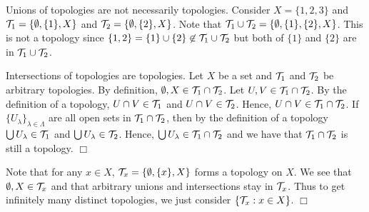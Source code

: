 \documentclass{article}
\begin{document}
 {
    Unions of topologies are not necessarily topologies. Consider $X = \{1, 2, 3\}$ and $\mathcal{T}_{1} = \{\emptyset, \{1\}, X\}$ and $\mathcal{T}_{2} = \{\emptyset, \{2\}, X\}$. Note that $\mathcal{T}_{1} \cup \mathcal{T}_{2} = \{\emptyset, \{1\}, \{2\}, X\}$. This is not a topology since $\{1,2\} = \{1\}\cup \{2\} \not\in\mathcal{T}_{1} \cup \mathcal{T}_{2}  $ but both of $\{1\}$ and $\{2\}$ are in $\mathcal{T}_{1} \cup \mathcal{T}_{2}$. 

    Intersections of topologies are topologies. Let $X$ be a set and $\mathcal{T}_{1}$ and $\mathcal{T}_{2}$ be arbitrary topologies. By definition, $\emptyset, X\in \mathcal{T}_{1}\cap \mathcal{T}_{2}$. Let $U,V\in \mathcal{T}_{1}\cap \mathcal{T}_{2}$. By the definition of a topology, $U\cap V \in \mathcal{T}_{1}$ and $U\cap V \in \mathcal{T}_{2}$. Hence, $U\cap V\in \mathcal{T}_{1}\cap \mathcal{T}_{2}$. If $\{U_{\lambda}\}_{\lambda\in \Lambda}$ are all open sets in $\mathcal{T}_{1}\cap\mathcal{T}_{2}$, then by the definition of a topology $\bigcup U_{\lambda}\in \mathcal{T}_{1}$ and $\bigcup U_{\lambda}\in \mathcal{T}_{2}$. Hence, $\bigcup U_{\lambda}\in \mathcal{T}_{1}\cap\mathcal{T}_{2}$ and we have that $\mathcal{T}_{1}\cap \mathcal{T}_{2}$ is still a topology. $\Box$
}

 {
    Note that for any $x\in X$, $\mathcal{T}_{x} = \{\emptyset, \{x\}, X\}$ forms a topology on $X$. We see that $\emptyset, X\in \mathcal{T}_{x}$ and that arbitrary unions and intersections stay in $\mathcal{T}_{x}$. Thus to get infinitely many distinct topologies, we just consider $\{\mathcal{T}_{x}: x\in X\}$. $\Box$
}
\end{document}
